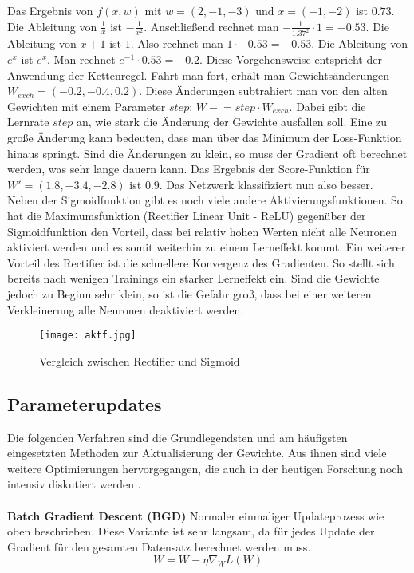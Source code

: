 \documentclass[11pt,ceqn]{book}
\newcommand{\minuseq}{\mathrel{-}=}
\begin{document}
Das Ergebnis von $f(x,w)$ mit $w = (2,-1,-3)$ und $x = (-1,-2)$ ist $0.73$. Die Ableitung von  $\frac{1}{x}$ ist $-\frac{1}{x^2}$. Anschließend rechnet man $-\frac{1}{1.37^2}\cdot 1 = -0.53$. Die Ableitung von $x+1$ ist $1$. Also rechnet man $1\cdot -0.53=-0.53$. Die Ableitung von $e^x$ ist $e^x$. Man rechnet $e^{-1}\cdot 0.53=-0.2$. Diese Vorgehensweise entspricht der Anwendung der Kettenregel. Fährt man fort, erhält man Gewichtsänderungen $W_{exch}=(-0.2,-0.4,0.2)$. Diese Änderungen subtrahiert man von den alten Gewichten mit einem Parameter $step$: $W \minuseq step \cdot W_{exch}$. Dabei gibt die Lernrate $step$ an, wie stark die Änderung der Gewichte ausfallen soll. Eine zu große Änderung kann bedeuten, dass man über das Minimum der Loss-Funktion hinaus springt. Sind die Änderungen zu klein, so muss der Gradient oft berechnet werden, was sehr lange dauern kann. Das Ergebnis der Score-Funktion für $W' = (1.8,-3.4,-2.8)$ ist $0.9$. Das Netzwerk klassifiziert nun also besser.\\

Neben der Sigmoidfunktion gibt es noch viele andere Aktivierungsfunktionen. So hat die Maximumsfunktion (Rectifier Linear Unit - ReLU) gegenüber der Sigmoidfunktion den Vorteil, dass bei relativ hohen Werten nicht alle Neuronen aktiviert werden und es somit weiterhin zu einem Lerneffekt kommt. Ein weiterer Vorteil des Rectifier ist die schnellere Konvergenz des Gradienten. So stellt sich bereits nach wenigen Trainings ein starker Lerneffekt ein. Sind die Gewichte jedoch zu Beginn sehr klein, so ist die Gefahr groß, dass bei einer weiteren Verkleinerung alle Neuronen deaktiviert werden.

\begin{figure}[H]
\centering
\texttt{[image: aktf.jpg]}
\caption{Vergleich zwischen Rectifier und Sigmoid}
\end{figure}

\subsection{Parameterupdates}
Die folgenden Verfahren sind die Grundlegendsten und am häufigsten eingesetzten Methoden zur Aktualisierung der Gewichte. Aus ihnen sind viele weitere Optimierungen hervorgegangen, die auch in der heutigen Forschung noch intensiv diskutiert werden \cite{gdalg}.\\~\\

\textbf{Batch Gradient Descent (BGD)}
Normaler einmaliger Updateprozess wie oben beschrieben. Diese Variante ist sehr langsam, da für jedes Update der Gradient für den gesamten Datensatz berechnet werden muss.
\[W = W - \eta \nabla_WL(W)\]
\end{document}
